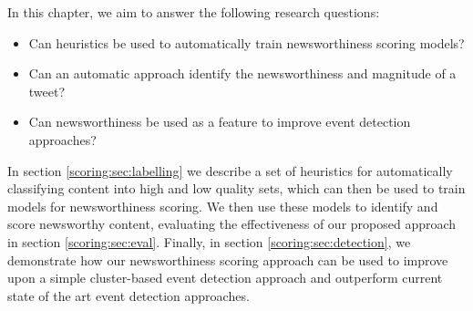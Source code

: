 \newpage
In this chapter, we aim to answer the following research questions:
\begin{itemize}
	\item Can heuristics be used to automatically train newsworthiness scoring models?
	\item Can an automatic approach identify the newsworthiness and magnitude of a tweet?
	\item Can newsworthiness be used as a feature to improve event detection approaches?
\end{itemize}

In section \ref{scoring:sec:labelling} we describe a set of heuristics for automatically classifying content into high and low quality sets, which can then be used to train models for newsworthiness scoring.
We then use these models to identify and score newsworthy content, evaluating the effectiveness of our proposed approach in section \ref{scoring:sec:eval}.
Finally, in section \ref{scoring:sec:detection}, we demonstrate how our newsworthiness scoring approach can be used to improve upon a simple cluster-based event detection approach and outperform current state of the art event detection approaches.
